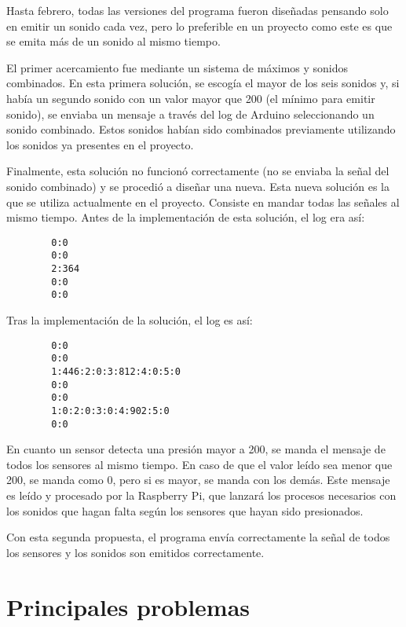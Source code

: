         Hasta febrero, todas las versiones del programa fueron diseñadas pensando solo en emitir un sonido cada vez,
        pero lo preferible en un proyecto como este es que se emita más de un sonido al mismo tiempo.

        El primer acercamiento fue mediante un sistema de máximos y sonidos combinados. En esta primera solución, se
        escogía el mayor de los seis sonidos y, si había un segundo sonido con un valor mayor que 200 (el mínimo para
        emitir sonido), se enviaba un mensaje a través del log de Arduino seleccionando un sonido combinado. Estos
        sonidos habían sido combinados previamente utilizando los sonidos ya presentes en el proyecto.

        Finalmente, esta solución no funcionó correctamente (no se enviaba la señal del sonido combinado) y se procedió
        a diseñar una nueva. Esta nueva solución es la que se utiliza actualmente en el proyecto. Consiste en mandar
        todas las señales al mismo tiempo. Antes de la implementación de esta solución, el log era así:

        \begin{verbatim}
        0:0
        0:0
        2:364
        0:0
        0:0
        \end{verbatim}

        Tras la implementación de la solución, el log es así:

        \begin{verbatim}
        0:0
        0:0
        1:446:2:0:3:812:4:0:5:0
        0:0
        0:0
        1:0:2:0:3:0:4:902:5:0
        0:0
        \end{verbatim}

        En cuanto un sensor detecta una presión mayor a 200, se manda el mensaje de todos los sensores al mismo tiempo.
        En caso de que el valor leído sea menor que 200, se manda como 0, pero si es mayor, se manda con los demás. Este
        mensaje es leído y procesado por la Raspberry Pi, que lanzará los procesos necesarios con los sonidos que hagan
        falta según los sensores que hayan sido presionados.

        Con esta segunda propuesta, el programa envía correctamente la señal de todos los sensores y los sonidos son
        emitidos correctamente.


    \section{Principales problemas} %
    \label{sec:PrincipalesProblemas}

